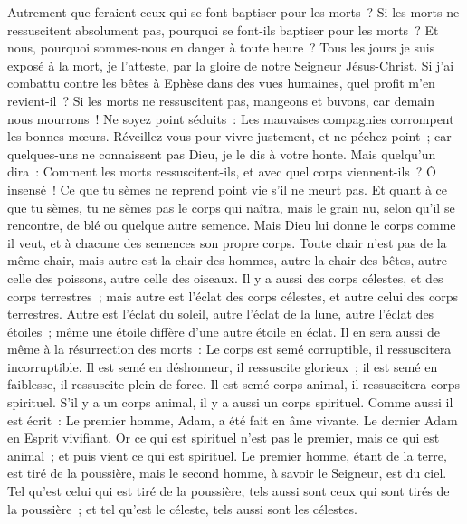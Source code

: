 \begin{multicols}{2}
Autrement que feraient ceux qui se font baptiser pour les morts~? Si les morts ne ressuscitent absolument pas, pourquoi se font-ils baptiser pour les morts~?
Et nous, pourquoi sommes-nous en danger à toute heure~?
Tous les jours je suis exposé à la mort, je l'atteste, par la gloire de notre Seigneur Jésus-Christ.
Si j'ai combattu contre les bêtes à Ephèse dans des vues humaines, quel profit m'en revient-il~? Si les morts ne ressuscitent pas, mangeons et buvons, car demain nous mourrons~!
Ne soyez point séduits~: Les mauvaises compagnies corrompent les bonnes mœurs.
Réveillez-vous pour vivre justement, et ne péchez point~; car quelques-uns ne connaissent pas Dieu, je le dis à votre honte.
Mais quelqu'un dira~: Comment les morts ressuscitent-ils, et avec quel corps viennent-ils~?
Ô insensé~! Ce que tu sèmes ne reprend point vie s'il ne meurt pas.
Et quant à ce que tu sèmes, tu ne sèmes pas le corps qui naîtra, mais le grain nu, selon qu'il se rencontre, de blé ou quelque autre semence.
Mais Dieu lui donne le corps comme il veut, et à chacune des semences son propre corps.
Toute chair n'est pas de la même chair, mais autre est la chair des hommes, autre la chair des bêtes, autre celle des poissons, autre celle des oiseaux.
Il y a aussi des corps célestes, et des corps terrestres~; mais autre est l'éclat des corps célestes, et autre celui des corps terrestres.
Autre est l'éclat du soleil, autre l'éclat de la lune, autre l'éclat des étoiles~; même une étoile diffère d'une autre étoile en éclat.
Il en sera aussi de même à la résurrection des morts~: Le corps est semé corruptible, il ressuscitera incorruptible.
Il est semé en déshonneur, il ressuscite glorieux~; il est semé en faiblesse, il ressuscite plein de force.
Il est semé corps animal, il ressuscitera corps spirituel. S'il y a un corps animal, il y a aussi un corps spirituel.
Comme aussi il est écrit~: Le premier homme, Adam, a été fait en âme vivante. Le dernier Adam en Esprit vivifiant.
Or ce qui est spirituel n'est pas le premier, mais ce qui est animal~; et puis vient ce qui est spirituel.
Le premier homme, étant de la terre, est tiré de la poussière, mais le second homme, à savoir le Seigneur, est du ciel.
Tel qu'est celui qui est tiré de la poussière, tels aussi sont ceux qui sont tirés de la poussière~; et tel qu'est le céleste, tels aussi sont les célestes.

\end{multicols}
